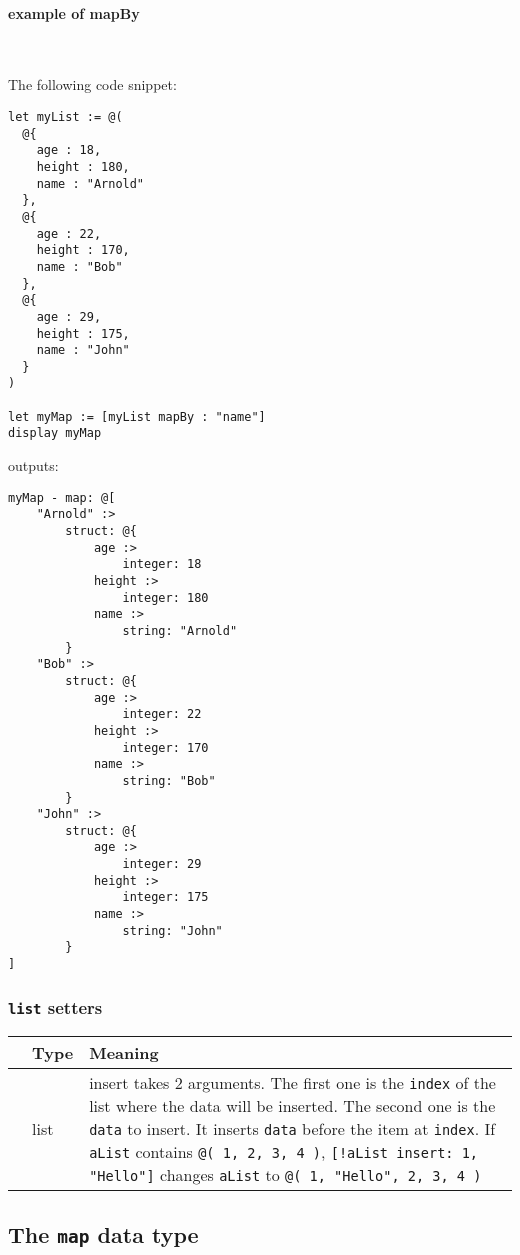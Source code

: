 \documentclass[11pt]{article}
\newcommand{\cfunction}[1]{{\ttfamily #1}}
\begin{document}
\paragraph{example of \cfunction{mapBy}}~

The following code snippet:

\begin{lstlisting}[language=goilTemplate]
let myList := @(
  @{
    age : 18,
    height : 180,
    name : "Arnold"
  },
  @{
    age : 22,
    height : 170,
    name : "Bob"
  },
  @{
    age : 29,
    height : 175,
    name : "John"
  }
)

let myMap := [myList mapBy : "name"]
display myMap
\end{lstlisting}

outputs:

{\small
\begin{verbatim}
myMap - map: @[
    "Arnold" :>
        struct: @{
            age :>
                integer: 18
            height :>
                integer: 180
            name :>
                string: "Arnold"
        }
    "Bob" :>
        struct: @{
            age :>
                integer: 22
            height :>
                integer: 170
            name :>
                string: "Bob"
        }
    "John" :>
        struct: @{
            age :>
                integer: 29
            height :>
                integer: 175
            name :>
                string: "John"
        }
]
\end{verbatim}

\subsubsection{\lstinline{list} setters}

\begin{longtable}{>{\ttfamily}l|l|p{3.88in}}
{\bf getter}&{\bf Type}&{\bf Meaning}\\
\hline\endhead
 {insert}&
  {list}&
  {\cfunction{insert} takes 2 arguments. The first one is the \texttt{index} of the list where the data will be inserted. The second one is the \texttt{data} to insert. It inserts \texttt{data} before the item at \texttt{index}. If \texttt{aList} contains \texttt{@( 1, 2, 3, 4 )}, \texttt{[!aList insert: 1, "Hello"]} changes \texttt{aList} to  \texttt{@( 1, "Hello", 2, 3, 4 )}}\\
\end{longtable}

\subsection{The \lstinline{map} data type}

}
\end{document}
